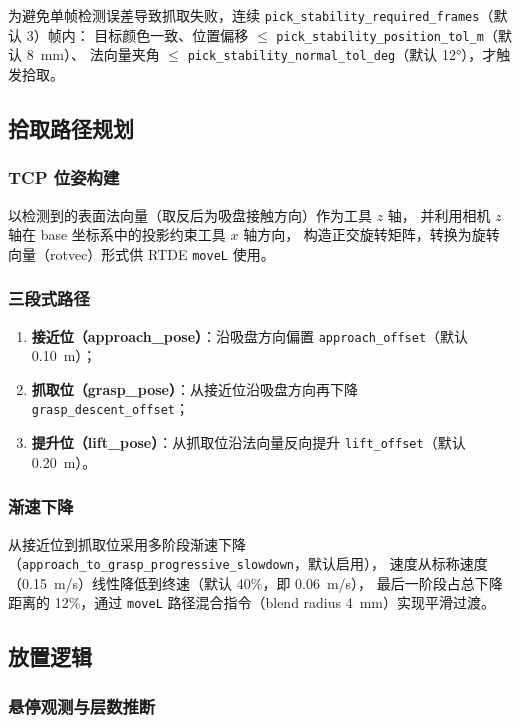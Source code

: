 \documentclass[12pt,a4paper]{article}
\begin{document}
为避免单帧检测误差导致抓取失败，连续 \texttt{pick\_stability\_required\_frames}（默认 3）帧内：
目标颜色一致、位置偏移 $\leq$ \texttt{pick\_stability\_position\_tol\_m}（默认 8~mm）、
法向量夹角 $\leq$ \texttt{pick\_stability\_normal\_tol\_deg}（默认 12°），才触发拾取。

\subsection{拾取路径规划}

\subsubsection{TCP 位姿构建}

以检测到的表面法向量（取反后为吸盘接触方向）作为工具 $z$ 轴，
并利用相机 $z$ 轴在 base 坐标系中的投影约束工具 $x$ 轴方向，
构造正交旋转矩阵，转换为旋转向量（rotvec）形式供 RTDE \texttt{moveL} 使用。

\subsubsection{三段式路径}

\begin{enumerate}[noitemsep]
  \item \textbf{接近位（approach\_pose）}：沿吸盘方向偏置 \texttt{approach\_offset}（默认 0.10~m）；
  \item \textbf{抓取位（grasp\_pose）}：从接近位沿吸盘方向再下降 \texttt{grasp\_descent\_offset}；
  \item \textbf{提升位（lift\_pose）}：从抓取位沿法向量反向提升 \texttt{lift\_offset}（默认 0.20~m）。
\end{enumerate}

\subsubsection{渐速下降}

从接近位到抓取位采用多阶段渐速下降（\texttt{approach\_to\_grasp\_progressive\_slowdown}，默认启用），
速度从标称速度（0.15~m/s）线性降低到终速（默认 40\%，即 0.06~m/s），
最后一阶段占总下降距离的 12\%，通过 \texttt{moveL} 路径混合指令（blend radius 4~mm）实现平滑过渡。

\subsection{放置逻辑}

\subsubsection{悬停观测与层数推断}
\end{document}
